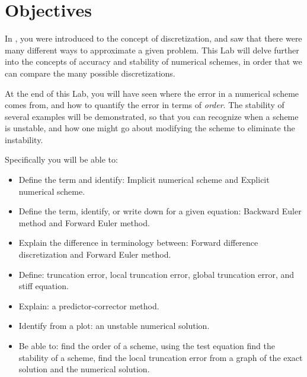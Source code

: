 % 
%
%
%
%
%
%
%
%

\section{Objectives}

In , you were introduced to the
concept of discretization, and saw that there were
many different ways to approximate a given problem.
This Lab will delve further into the concepts of accuracy and
stability of numerical schemes, in order that we can compare the many
possible discretizations.

At the end of this Lab, you will have seen where the error in a
numerical scheme comes from, and how to quantify the error in terms of
\emph{ order}.  
The stability of several examples will be demonstrated, so that you
can recognize when a scheme is unstable, and how one might go about
modifying the scheme to eliminate the instability.

Specifically you will be able to:
\begin {itemize}

\item Define the term and identify: Implicit numerical scheme and
Explicit numerical scheme.

\item Define the term, identify, or write down for a given equation:
Backward Euler method and Forward Euler method.

\item Explain the difference in terminology between:
Forward difference discretization and Forward Euler method.

\item Define: truncation error, local truncation error, global truncation error,
and stiff equation.

\item Explain:  a predictor-corrector method.

\item Identify from a plot: an unstable numerical solution.

\item Be able to: find the order of a scheme, using the test equation
find the stability of a scheme, find the local truncation error from
a graph of the exact solution and the numerical solution.

\end {itemize}


